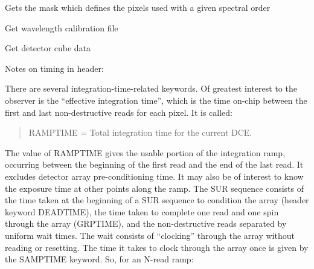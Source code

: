 \documentclass[a4paper,11pt,english]{sphinxmanual}
\begin{document}
\begin{fulllineitems}
\begin{fulllineitems}
\end{fulllineitems}


\begin{fulllineitems}
\label{\detokenize{cascade.instruments:cascade.instruments.instruments.SpitzerIRS._get_order_mask}}
Gets the mask which defines the pixels used with a given spectral order

\end{fulllineitems}


\begin{fulllineitems}
\label{\detokenize{cascade.instruments:cascade.instruments.instruments.SpitzerIRS._get_wavelength_calibration}}
Get wavelength calibration file

\end{fulllineitems}


\begin{fulllineitems}
\label{\detokenize{cascade.instruments:cascade.instruments.instruments.SpitzerIRS.get_detector_cubes}}
Get detector cube data

Notes on timing in header:

There are several integration-time-related keywords.
Of greatest interest to the observer is the
“effective integration time”, which is the time on-chip between
the first and last non-destructive reads for each pixel. It is called:
\begin{quote}

RAMPTIME = Total integration time for the current DCE.
\end{quote}

The value of RAMPTIME gives the usable portion of the integration ramp,
occurring between the beginning of the first read and the end of the
last read. It excludes detector array pre-conditioning time.
It may also be of interest to know the exposure time at other points
along the ramp. The SUR sequence consists of the time taken at the
beginning of a SUR sequence to condition the array
(header keyword DEADTIME), the time taken to complete one read and
one spin through the array (GRPTIME), and the non-destructive reads
separated by uniform wait times. The wait consists of “clocking”
through the array without reading or resetting. The time it takes to
clock through the array once is given by the SAMPTIME keyword.
So, for an N-read ramp:
\begin{quote}


\end{quote}
\end{fulllineitems}
\end{fulllineitems}
\end{document}
